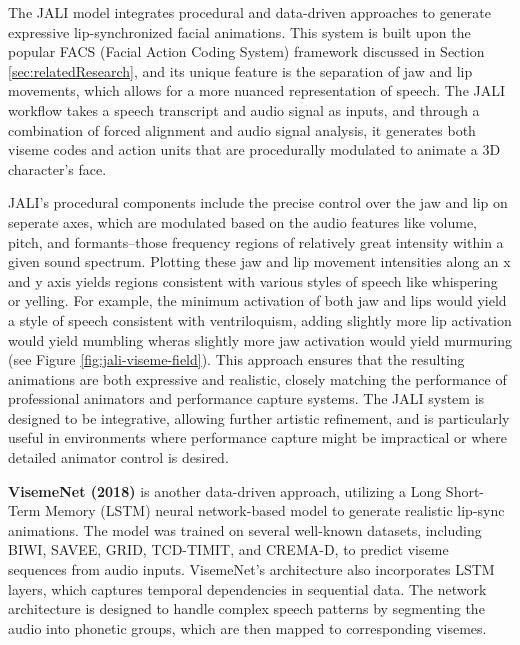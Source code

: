 \documentclass[12pt]{article}
\begin{document}
The JALI  model integrates procedural and data-driven approaches to generate expressive lip-synchronized facial animations. This system is built upon the popular FACS (Facial Action Coding System) framework \cite{Edwards2020jali-driven, Edwards2016} discussed in Section \ref{sec:relatedResearch}, and its unique feature is the separation of jaw and lip movements, which allows for a more nuanced representation of speech. The JALI workflow takes a speech transcript and audio signal as inputs, and through a combination of forced alignment and audio signal analysis, it generates both viseme codes and action units that are procedurally modulated to animate a 3D character's face.

JALI’s procedural components include the precise control over the jaw and lip on seperate axes, which are modulated based on the audio features like volume, pitch, and formants--those frequency regions of relatively great intensity within a given sound spectrum. Plotting these jaw and lip movement intensities along an x and y axis yields regions consistent with various styles of speech like whispering or yelling. For example, the minimum activation of both jaw and lips would yield a style of speech consistent with ventriloquism, adding slightly more lip activation would yield mumbling wheras slightly more jaw activation would yield murmuring (see Figure \ref{fig:jali-viseme-field}). This approach ensures that the resulting animations are both expressive and realistic, closely matching the performance of professional animators and performance capture systems. The JALI system is designed to be integrative, allowing further artistic refinement, and is particularly useful in environments where performance capture might be impractical or where detailed animator control is desired.

\textbf{VisemeNet (2018)} \cite{Zhou2018visemenet} is another data-driven approach, utilizing a Long Short-Term Memory (LSTM) neural network-based model to generate realistic lip-sync animations. The model was trained on several well-known datasets, including BIWI, SAVEE, GRID, TCD-TIMIT, and CREMA-D, to predict viseme sequences from audio inputs. VisemeNet’s architecture also incorporates LSTM layers, which captures temporal dependencies in sequential data. The network architecture is designed to handle complex speech patterns by segmenting the audio into phonetic groups, which are then mapped to corresponding visemes. 
\end{document}

